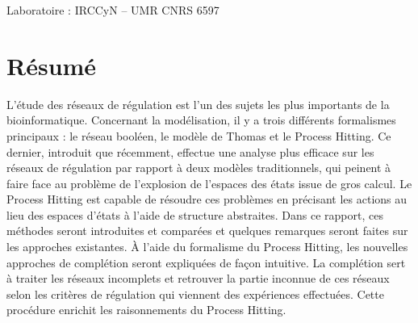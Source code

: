 \documentclass[11pt]{report}
\theoremstyle{definition}
\begin{document}
{Laboratoire : IRCCyN – UMR CNRS 6597}

\clearpage
\thispagestyle{empty}
\renewcommand{\contentsname}{Table de Mati\`eres}
\tableofcontents
\clearpage


\chapter*{R\'esum\'e}
L'\'etude des r\'eseaux de r\'egulation est l'un des sujets les plus importants de la bioinformatique. Concernant
la mod\'elisation, il y a trois diff\'erents formalismes principaux : le r\'eseau bool\'een, le mod\`ele de
Thomas et le Process Hitting.
Ce dernier, introduit que r\'ecemment, effectue une
analyse plus efficace sur les r\'eseaux de r\'egulation par rapport \`a deux mod\`eles traditionnels,
qui peinent \`a faire face au probl\`eme de l'explosion de l'espaces des \'etats issue de gros calcul.
Le Process Hitting est capable de r\'esoudre ces probl\`emes en pr\'ecisant les actions au lieu des espaces d'\'etats \`a l'aide de structure abstraites.
Dans ce rapport, ces m\'ethodes seront introduites et compar\'ees et quelques remarques
seront faites sur les approches existantes.
\`A l'aide du formalisme du Process Hitting, les nouvelles approches de compl\'etion seront expliqu\'ees de fa\c con intuitive.
La compl\'etion sert \`a traiter les r\'eseaux incomplets et retrouver la partie inconnue de ces r\'eseaux selon les crit\`eres de r\'egulation qui viennent des exp\'eriences effectu\'ees.
Cette proc\'edure enrichit les raisonnements du Process Hitting.
\end{document}
